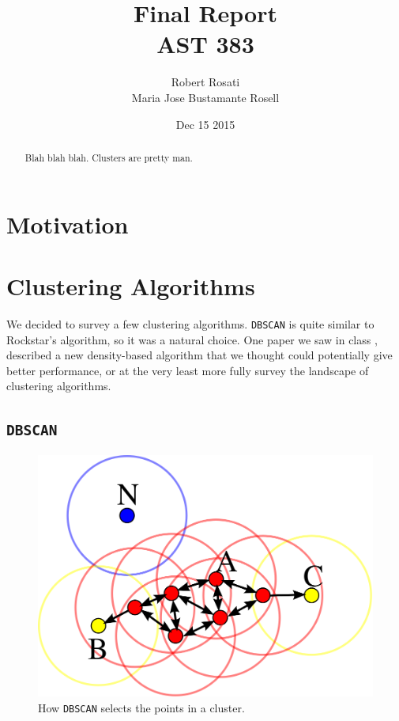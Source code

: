 \documentclass[12pt]{article}
\begin{document}
\singlespacing
\title{Final Report\\
AST 383}
\date{Dec 15 2015}
\author{Robert Rosati \\ Maria Jose Bustamante Rosell}
\maketitle

\begin{abstract}
\par Blah blah blah. Clusters are pretty man.
\end{abstract}

\doublespacing
\section{Motivation}

\section{Clustering Algorithms}
\par We decided to survey a few clustering algorithms.
\texttt{DBSCAN} is quite similar to Rockstar's algorithm, so it was a natural choice.
One paper we saw in class \cite{FIDEPE}, described a new density-based algorithm that we thought could potentially give better performance, or at the very least more fully survey the landscape of clustering algorithms.

\subsection{\texttt{DBSCAN}}
\begin{figure}[ht]
\centering
\includegraphics[width=0.8\linewidth]{DBSCAN-Illustration}
\caption{How \texttt{DBSCAN} selects the points in a cluster.}
\label{fig:DBSCAN}
\end{figure}
\end{document}
